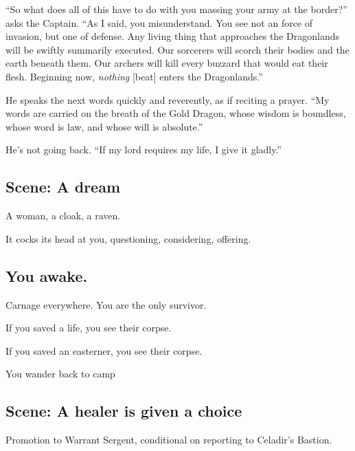\begin{multicols}{2}
\begin{aloud}
  ``So what does all of this have to do with you massing your army at the border?''
     asks the Captain.
  ``As I said, you misunderstand.
    You see not an force of invasion, but one of defense.
    Any living thing that approaches the Dragonlands will be swiftly summarily executed.
    Our sorcerers will scorch their bodies and the earth beneath them.
    Our archers will kill every buzzard that would eat their flesh.
    Beginning now, \emph{nothing} [beat] enters the Dragonlands.''

    He speaks the next words quickly and reverently, as if reciting a prayer.
  ``My words are carried on the breath of the Gold Dragon,
      whose wisdom is boundless, whose word is law, and whose will is absolute.''
  \end{aloud}

  He's not going back.
  ``If my lord requires my life, I give it gladly.''



\subsection{Scene: A dream}

A woman, a cloak, a raven.

It cocks its head at you, questioning, considering, offering.

\subsection{You awake.}

Carnage everywhere.
You are the only survivor.

If you saved a life, you see their corpse.

If you saved an easterner, you see their corpse.

You wander back to camp

\subsection{Scene: A healer is given a choice}

Promotion to Warrant Sergent, conditional on reporting to Celadir's Bastion.

\end{multicols}
